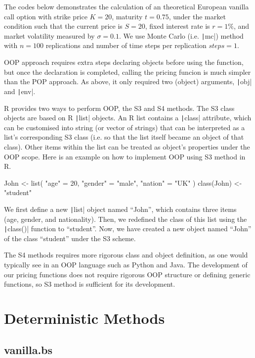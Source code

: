 The codes below demonstrates the calculation of an theoretical European vanilla call option with strike price $K = 20$, maturity $t = 0.75$, under the market condition such that the current price is $S = 20$, fixed interest rate is $r = 1\%$, and market volatility measured by $\sigma = 0.1$. We use Monte Carlo (i.e. \texttt|mc|) method with $n = 100$ replications and number of time steps per replication $steps = 1$.

OOP approach requires extra steps declaring objects before using the function, but once the declaration is completed, calling the pricing funcion is much simpler than the POP approach. As above, it only required two (object) arguments, \texttt|obj| and \texttt|env|.

R provides two ways to perform OOP, the S3 and S4 methods. The S3 class objects are based on R \texttt|list| objects. An R list contains a \texttt|class| attribute, which can be customised into string (or vector of strings) that can be interpreted as a list's corresponding S3 class (i.e. so that the list itself became an object of that class). Other items within the list can be treated as object's properties under the OOP scope. Here is an example on how to implement OOP using S3 method in R.

\begin{Rminted}
John <- list(
    "age" = 20,
    "gender" = "male",
    "nation" = "UK"
)
class(John) <- "student"
\end{Rminted}

We first define a new \texttt|list| object named ``John'', which contains three items (age, gender, and nationality). Then, we redefined the class of this list using the \texttt|class()| function to ``student''. Now, we have created a new object named ``John'' of the class ``student'' under the S3 scheme.

The S4 methods requires more rigorous class and object definition, as one would typically see in an OOP language such as Python and Java. The development of our pricing functions does not require rigorous OOP structure or defining generic functions, so S3 method is sufficient for its development.

\section{Deterministic Methods}

\subsection{vanilla.bs}

